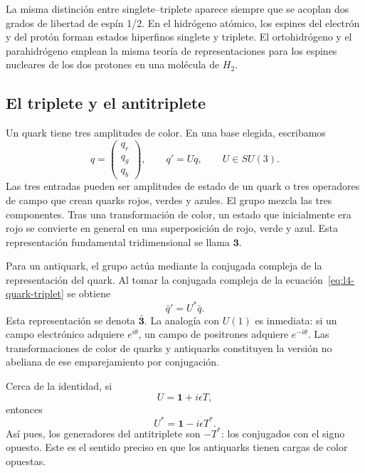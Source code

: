 La misma distinción entre singlete--triplete aparece siempre que se acoplan dos grados de libertad de espín 1/2. En el hidrógeno atómico, los espines del electrón y del protón forman estados hiperfinos singlete y triplete. El ortohidrógeno y el parahidrógeno emplean la misma teoría de representaciones para los espines nucleares de los dos protones en una molécula de \(H_2\).

\subsection{El triplete y el antitriplete}

Un quark tiene tres amplitudes de color. En una base elegida, escribamos
\begin{equation}
q=
\begin{pmatrix}
q_r\\q_g\\q_b
\end{pmatrix},
\qquad
q'=Uq,
\qquad U\in SU(3).
\label{eq:l4-quark-triplet}
\end{equation}
Las tres entradas pueden ser amplitudes de estado de un quark o tres operadores de campo que crean quarks rojos, verdes y azules. El grupo mezcla las tres componentes. Tras una transformación de color, un estado que inicialmente era rojo se convierte en general en una superposición de rojo, verde y azul. Esta representación fundamental tridimensional se llama \(\boldsymbol 3\).

Para un antiquark, el grupo actúa mediante la conjugada compleja de la representación del quark. Al tomar la conjugada compleja de la ecuación~\eqref{eq:l4-quark-triplet} se obtiene
\begin{equation}
\bar q'=U^*\bar q.
\end{equation}
Esta representación se denota \(\bar{\boldsymbol 3}\). La analogía con \(U(1)\) es inmediata: si un campo electrónico adquiere \(e^{i\theta}\), un campo de positrones adquiere \(e^{-i\theta}\). Las transformaciones de color de quarks y antiquarks constituyen la versión no abeliana de ese emparejamiento por conjugación.

Cerca de la identidad, si
\begin{equation}
U=\boldsymbol 1+i\epsilon T,
\end{equation}
entonces
\begin{equation}
U^*=\boldsymbol 1-i\epsilon T^*.
\end{equation}
Así pues, los generadores del antitriplete son \(-T^*\): los conjugados con el signo opuesto. Este es el sentido preciso en que los antiquarks tienen cargas de color opuestas.

